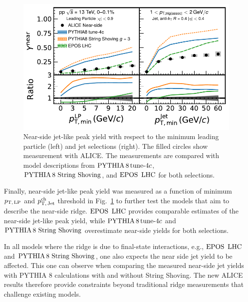 \begin{figure}[h!]
	\centering
	\includegraphics[width=0.89\linewidth]{./figures/Fig9_JetYieldESE.pdf}
	\caption{ Near-side jet-like peak yield with respect to the minimum leading particle (left) and jet selections (right). The filled circles show measurement with ALICE. The measurements are compared with model descriptions from $\mathrm{PYTHIA}\,8\,\mathrm{tune}{\text -}4c$, ${\mathrm{PYTHIA}\,8~\mathrm{String}~}\mathrm{Shoving}$, and ${\mathrm{EPOS}\,~\mathrm{LHC}}$ for both selections.}
	\label{fig:JetYield_ESE}
\end{figure}

Finally, near-side jet-like peak yield was measured as a function of minimum $p_\mathrm{T,\,LP}$ and $p_\mathrm{T,\,Jet}^\mathrm{ch}$ threshold in Fig.~\ref{fig:JetYield_ESE} to further test the models that aim to describe the near-side ridge.
${\mathrm{EPOS}\,~\mathrm{LHC}}$ provides comparable estimates of the near-side jet-like peak yield, while $\mathrm{PYTHIA}\,8\,\mathrm{tune}{\text -}4c$ and ${\mathrm{PYTHIA}\,8~\mathrm{String}~}\mathrm{Shoving}$ overestimate near-side yields for both selections.

In all models where the ridge is due to final-state interactions, e.g., ${\mathrm{EPOS}\,~\mathrm{LHC}}$ and ${\mathrm{PYTHIA}\,8~\mathrm{String}~}\mathrm{Shoving}$, one also expects the near side jet yield to be affected. This one can observe when comparing the measured near-side jet yields with PYTHIA 8 calculations with and without String Shoving. The new ALICE results therefore provide constraints beyond traditional ridge measurements that challenge existing models.